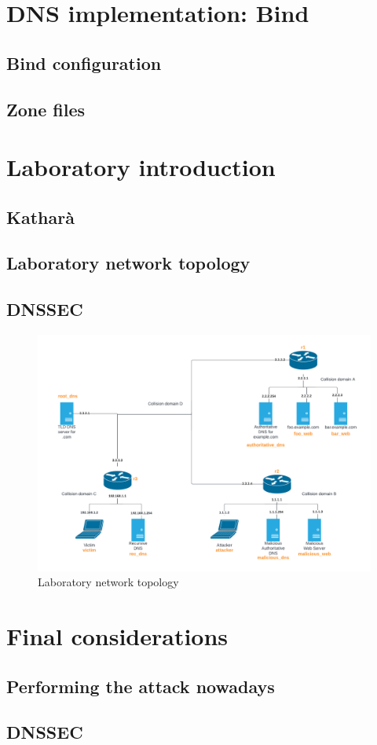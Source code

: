 \documentclass[11pt,a4paper]{article}
\begin{document}
\section{DNS implementation: Bind}

\subsection{Bind configuration}

\subsection{Zone files}

\section{Laboratory introduction}

\subsection{Katharà}

\subsection{Laboratory network topology}
\subsection{DNSSEC}
\begin{figure}[h]
  \centering
  \includegraphics[scale=0.56]{network-topology.png}
  \caption{Laboratory network topology}
\end{figure}

\section{Final considerations}

\subsection{Performing the attack nowadays}

\subsection{DNSSEC}
\end{document}
